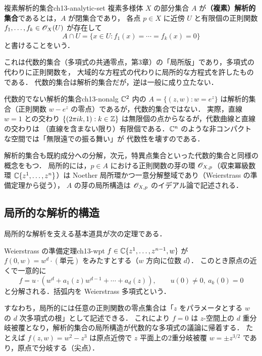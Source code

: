 \begin{mydef}{複素解析的集合}{ch13-analytic-set}
複素多様体 $X$ の部分集合 $A$ が\textbf{（複素）解析的集合}であるとは，$A$ が閉集合であり，
各点 $p\in X$ に近傍 $U$ と有限個の正則関数 $f_1,\dots,f_k\in\mathscr{O}_X(U)$ が存在して
\begin{equation}
  A\cap U = \{x\in U : f_1(x)=\cdots=f_k(x)=0\}
\end{equation}
と書けることをいう．
\end{mydef}

これは代数的集合（多項式の共通零点，第3章）の「局所版」であり，多項式の代わりに正則関数を，
大域的な方程式の代わりに局所的な方程式を許したものである．
代数的集合は解析的集合だが，逆は一般に成り立たない．

\begin{myex}{代数的でない解析的集合}{ch13-nonalg}
$\mathbb{C}^2$ 内の $A=\{(z,w): w = e^z\}$ は解析的集合（正則関数 $w-e^z$ の零点）であるが，代数的集合ではない．
実際，直線 $w=1$ との交わり $\{(2\pi i k,1):k\in\mathbb{Z}\}$ は無限個の点からなるが，代数曲線と直線の交わりは
（直線を含まない限り）有限個である．$\mathbb{C}^n$ のような非コンパクトな空間では「無限遠での振る舞い」が
代数性を壊すのである．
\end{myex}

解析的集合も既約成分への分解，次元，特異点集合といった代数的集合と同様の概念をもつ．
局所的には，$p\in A$ における正則関数の芽の環 $\mathscr{O}_{X,p}$（収束冪級数環 $\mathbb{C}\{z^1,\dots,z^n\}$）は
Noether 局所環かつ一意分解整域であり（Weierstrass の準備定理から従う），
$A$ の芽の局所構造は $\mathscr{O}_{X,p}$ のイデアル論で記述される．

\subsection{局所的な解析的構造}

局所的な解析を支える基本道具が次の定理である．

\begin{mythm}{Weierstrass の準備定理}{ch13-wpt}
$f\in\mathbb{C}\{z^1,\dots,z^{n-1},w\}$ が $f(0,w)=w^d\cdot(\text{単元})$ をみたすとする（$w$ 方向に位数 $d$）．
このとき原点の近くで一意的に
\begin{equation}
  f = u\cdot\left(w^d + a_1(z)w^{d-1}+\cdots+a_d(z)\right),\qquad u(0)\neq0,\ a_k(0)=0
\end{equation}
と分解される．括弧内を Weierstrass 多項式という．
\end{mythm}

すなわち，局所的には任意の正則関数の零点集合は「$z$ をパラメータとする $w$ の $d$ 次多項式の根」として記述できる．
これにより $f=0$ は $z$-空間上の $d$ 重分岐被覆となり，解析的集合の局所構造が代数的な多項式の議論に帰着する．
たとえば $f(z,w)=w^2-z^3$ は原点近傍で $z$ 平面上の2重分岐被覆 $w=\pm z^{3/2}$ であり，原点で分岐する（尖点）．

